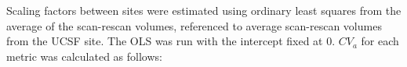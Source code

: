 Scaling factors between sites were estimated using ordinary least squares from the average of the scan-rescan volumes, referenced to average scan-rescan volumes from the UCSF site. The OLS was run with the intercept fixed at 0. $CV_a$ for each metric was calculated as follows: %
